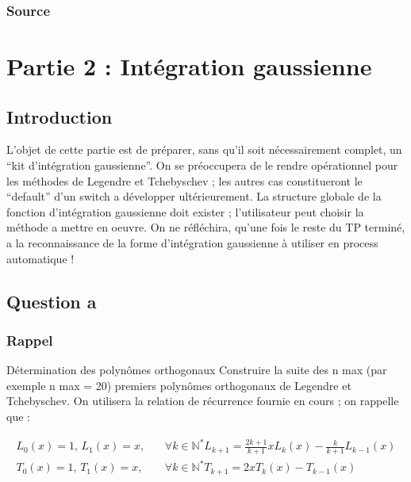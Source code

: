\documentclass[a4paper,10pt]{report}
\newcommand{\N}{\mathbb{N}}
\begin{document}
\newpage
\subsection*{Source}

\begin{center}
	
\end{center}

\chapter*{Partie 2 : Intégration gaussienne}


\section*{Introduction}

L'objet de cette partie est de préparer, sans qu'il soit nécessairement complet, un “kit d'intégration gaussienne”. On se préoccupera de le rendre opérationnel pour les méthodes de Legendre et Tchebyschev ; les autres cas constitueront le “default” d'un switch a développer ultérieurement.
La structure globale de la fonction d'intégration gaussienne doit exister ; l'utilisateur peut choisir  la méthode a mettre en oeuvre.
On ne réfléchira, qu'une fois le reste du TP terminé, a la reconnaissance de la forme d'intégration gaussienne à utiliser en process automatique !

\section*{Question a}

\subsection*{Rappel}

Détermination des polynômes orthogonaux Construire la suite des n max (par exemple n max = 20) premiers polynômes orthogonaux de Legendre et Tchebyschev. On utilisera la relation de récurrence fournie en cours ; on rappelle que :

\begin{eqnarray*}
L_0 (x) = 1 \text{, }L_1 (x) = x \text{, } &&\forall k \in \N^* L_{k+1} = \frac{2k+1}{k+1}xL_k (x) - \frac{k}{k+1}L_{k-1}(x)\\
T_0 (x) = 1 \text{, }T_1 (x) = x \text{, } &&\forall k \in \N^* T_{k+1} = 2xT_k (x) - T_{k-1}(x)
\end{eqnarray*}
\end{document}
